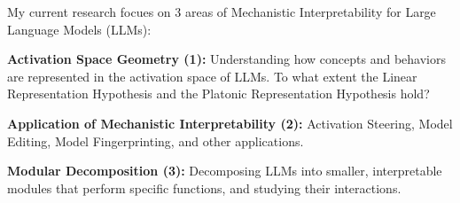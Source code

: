 My current research focues on 3 areas of Mechanistic Interpretability for Large Language Models (LLMs):
\begin{zitemize}
    \item \textbf{Activation Space Geometry (1):} Understanding how concepts and behaviors are represented
in the activation space of LLMs. To what extent the Linear Representation Hypothesis and
the Platonic Representation Hypothesis hold?~\cite{vu2025angular}
    \item \textbf{Application of Mechanistic Interpretability (2):} Activation Steering,
Model Editing, Model Fingerprinting, and other applications.~\cite{vu2025angular,nguyen2025activationsteeringfeedbackcontroller}
    \item \textbf{Modular Decomposition (3):} Decomposing LLMs into smaller, interpretable modules that
    perform specific functions, and studying their interactions.~\cite{vu2025angular,son2022jointly,nguyen2021span}
\end{zitemize}